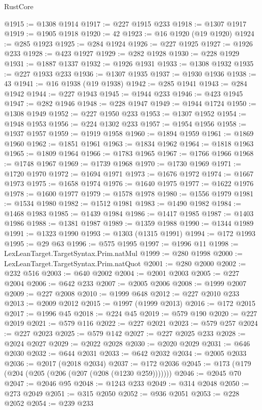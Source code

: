 \begin{lexlean}{RustCore}
\begin{coremodule}
@1915 := @1308 @1914
@1917 := @227 @1915 @233
@1918 := @1307 @1917
@1919 := @1905 @1918
@1920 := 42
@1923 := @16 @1920 (@19 @1920)
@1924 := @285 @1923
@1925 := @284 @1924
@1926 := @227 @1925
@1927 := @1926 @233
@1928 := @423 @1927
@1929 := @282 @1928
@1930 := @228 @1929
@1931 := @1887 @1337
@1932 := @1926 @1931
@1933 := @1308 @1932
@1935 := @227 @1933 @233
@1936 := @1307 @1935
@1937 := @1930 @1936
@1938 := 43
@1941 := @16 @1938 (@19 @1938)
@1942 := @285 @1941
@1943 := @284 @1942
@1944 := @227 @1943
@1945 := @1944 @233
@1946 := @423 @1945
@1947 := @282 @1946
@1948 := @228 @1947
@1949 := @1944 @1724
@1950 := @1308 @1949
@1952 := @227 @1950 @233
@1953 := @1307 @1952
@1954 := @1948 @1953
@1956 := @224 @1302 @233
@1957 := @1954 @1956
@1958 := @1937 @1957
@1959 := @1919 @1958
@1960 := @1894 @1959
@1961 := @1869 @1960
@1962 := @1851 @1961
@1963 := @1834 @1962
@1964 := @1818 @1963
@1965 := @1809 @1964
@1966 := @1783 @1965
@1967 := @1766 @1966
@1968 := @1748 @1967
@1969 := @1739 @1968
@1970 := @1730 @1969
@1971 := @1720 @1970
@1972 := @1694 @1971
@1973 := @1676 @1972
@1974 := @1667 @1973
@1975 := @1658 @1974
@1976 := @1640 @1975
@1977 := @1622 @1976
@1978 := @1600 @1977
@1979 := @1578 @1978
@1980 := @1556 @1979
@1981 := @1534 @1980
@1982 := @1512 @1981
@1983 := @1490 @1982
@1984 := @1468 @1983
@1985 := @1439 @1984
@1986 := @1417 @1985
@1987 := @1403 @1986
@1988 := @1381 @1987
@1989 := @1359 @1988
@1990 := @1344 @1989
@1991 := @1323 @1990
@1993 := @1303 (@1315 @1991)
@1994 := @172 @1993
@1995 := @29 @63
@1996 := @575 @1995
@1997 := @1996 @11
@1998 := LexLeanTarget.TargetSyntax.Prim.natMul
@1999 := @280 @1998
@2000 := LexLeanTarget.TargetSyntax.Prim.natQuot
@2001 := @280 @2000
@2002 := @232 @516
@2003 := @640 @2002
@2004 := @2001 @2003
@2005 := @227 @2004
@2006 := @642 @233
@2007 := @2005 @2006
@2008 := @1999 @2007
@2009 := @227 @2008
@2010 := @1999 @648
@2012 := @227 @2010 @233
@2013 := @2009 @2012
@2015 := @1997 (@1999 @2013)
@2016 := @172 @2015
@2017 := @1996 @45
@2018 := @224 @45
@2019 := @579 @190
@2020 := @227 @2019
@2021 := @579 @116
@2022 := @227 @2021
@2023 := @579 @257
@2024 := @227 @2023
@2025 := @579 @142
@2027 := @227 @2025 @233
@2028 := @2024 @2027
@2029 := @2022 @2028
@2030 := @2020 @2029
@2031 := @646 @2030
@2032 := @644 @2031
@2033 := @642 @2032
@2034 := @2005 @2033
@2036 := @2017 (@2018 @2034)
@2037 := @172 @2036
@2045 := @173 (@179 (@204 (@205 (@206 (@207 (@208 (@1230 @259)))))))
@2046 := @2045 @70
@2047 := @2046 @95
@2048 := @1243 @233
@2049 := @314 @2048
@2050 := @273 @2049
@2051 := @315 @2050
@2052 := @936 @2051
@2053 := @228 @2052
@2054 := @239 @233

\end{coremodule}
\end{lexlean}
